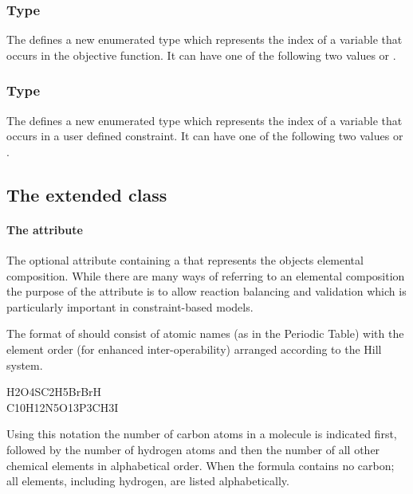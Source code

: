 \subsubsection{Type }
\label{primtype-fbcfluxobjectivevariabletype}

The \FBCPackage defines a new enumerated type  which
represents the index of a variable that occurs in the objective function. It can have one
of the following two values  or .

\subsubsection{Type }
\label{primtype-fbcuserconstraintvariabletype}

The \FBCPackage defines a new enumerated type  which
represents the index of a variable that occurs in a user defined constraint. It can have one
of the following two values  or .


\subsection{The extended  class}

\paragraph{The  attribute}
\label{chemicalFormula-attribute}
The optional attribute  containing a
 that represents the \Species objects elemental
composition.
%
%
While there are many ways of referring to an elemental composition the purpose
of the  attribute is to allow reaction balancing and
validation which is particularly important in constraint-based models.

The format of  should consist of atomic names
(as in the Periodic Table) with the element order (for enhanced inter-operability) arranged according to the Hill system\citep{hillsystem,
hillwikipedia}.
%
\begin{table}[h!]
  H2O4S\qquad C2H5Br\qquad BrH\\
  C10H12N5O13P3\qquad CH3I\\
  \caption{Examples of chemical formulas written using the Hill System. As
	described in \ref{chemicalFormula-attribute}}\label{table:hill}
\end{table}
%
Using this notation the number of carbon atoms in a molecule is indicated
first, followed by the number of hydrogen atoms and then the number of all
other chemical elements in alphabetical order. When the formula contains no
carbon; all elements, including hydrogen, are listed alphabetically.


